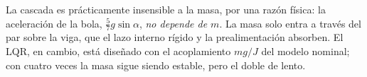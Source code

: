 La cascada es prácticamente insensible a la masa, por una razón física: la aceleración de la bola, $\tfrac57g\sin\alpha$, \emph{no depende de $m$}. La masa solo entra a través del par sobre la viga, que el lazo interno rígido y la prealimentación absorben. El LQR, en cambio, está diseñado con el acoplamiento $mg/J$ del modelo nominal; con cuatro veces la masa sigue siendo estable, pero el doble de lento.
